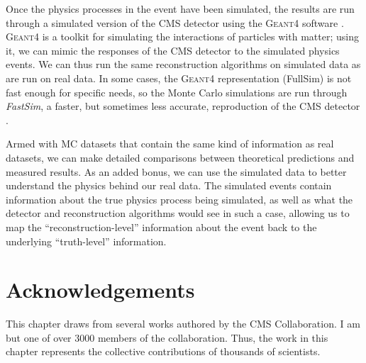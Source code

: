 Once the physics processes in the event have been simulated, the
results are run through a simulated version of the CMS detector using
the \textsc{Geant4} software \cite{geant}. \textsc{Geant4} is a
toolkit for simulating the interactions of particles with matter;
using it, we can mimic the responses of the CMS detector to the
simulated physics events. We can thus run the same reconstruction
algorithms on simulated data as are run on real data. In some cases,
the \textsc{Geant4} representation (FullSim) is not fast enough
for specific needs, so the Monte Carlo simulations are run through
\emph{FastSim}, a faster, but sometimes less accurate, reproduction of
the CMS detector \cite{fastsim}.

Armed with MC datasets that contain the same kind of information as
real datasets, we can make detailed comparisons between theoretical
predictions and measured results. As an added bonus, we can use the
simulated data to better understand the physics behind our real
data. The simulated events contain information about the true physics
process being simulated, as well as what the detector and
reconstruction algorithms would see in such a case, allowing us to
map the ``reconstruction-level'' information about the event back to
the underlying ``truth-level'' information.

\section{Acknowledgements}
\label{sec:hardware:acknowledgements}

This chapter draws from several works authored by the CMS
Collaboration. I am but one of over 3000 members of the
collaboration. Thus, the work in this chapter represents the
collective contributions of thousands of scientists.

